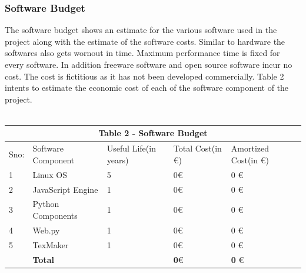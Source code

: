 \subsubsection{Software Budget}
The software budget shows an estimate for the various software used in the project along with
the estimate of the software costs. Similar to hardware the softwares also gets wornout in time. Maximum performance time is fixed for every software. In addition freeware software and open source
software incur no cost. The cost is fictitious as it has not been developed commercially. Table 2
intents to estimate the economic cost of each of the software component of the project.
\\ \\
\begin{table}[H]
\centering
\begin{tabular}{|p{1cm}||p{3cm}|p{2cm}|p{3cm}|p{3cm}|}
 \hline
 \multicolumn{5}{|c|}{Table 2 - Software Budget} \\
 \hline
 Sno: & Software Component&Useful Life(in years) &Total Cost(in \euro) &Amortized Cost(in \euro)\\
 \hline
1   & Linux OS  &5 &  0\euro  & 0 \euro \\
2   & JavaScript Engine  &1 &  0\euro  & 0 \euro \\
3   & Python Components  &1 &  0\euro  & 0 \euro \\
4   & Web.py  &1 &  0\euro  & 0 \euro \\
5   & TexMaker  &1 &  0\euro  & 0 \euro \\

\hline
\hline
   & \textbf{Total}  &  &  \textbf{0}\euro  & \textbf{0} \euro \\
 \hline
\end{tabular}
\end{table}


